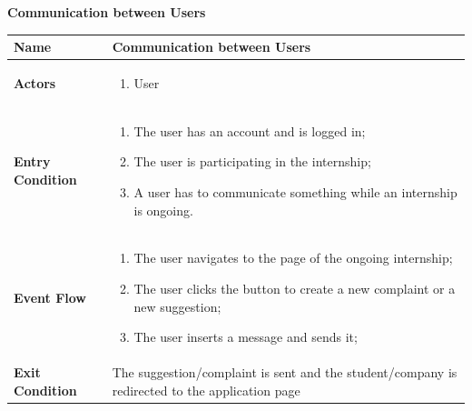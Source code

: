\begin{enumerate}[label=\textbf{[US\arabic*]}, left = 0pt, align = left, resume]
            \newpage
            \item \textbf{Communication between Users}
            
            \begin{longtable}{|l|p{11cm}|}  
                \hline
                \textbf{Name} & 
                    \textbf{Communication between Users} \\
                \hline
                
                \textbf{Actors} & 
                    \begin{enumerate}[label=\textbullet, itemsep=0em]
                        \item User
                    \end{enumerate} \\
                \hline
                
                \textbf{Entry Condition} & 
                    \begin{enumerate}[label=\textbullet, itemsep=0em]
                        \item The user has an account and is logged in;
                        \item The user is participating in the internship;
                        \item A user has to communicate something while an internship is ongoing.
                    \end{enumerate} \\
                \hline
                
                \textbf{Event Flow} &
                    \begin{enumerate}[label=\arabic*., itemsep=0.2em]
                        \item The user navigates to the page of the ongoing internship;
                        \item The user clicks the button to create a new complaint or a new suggestion;
                        \item The user inserts a message and sends it; 
                    \end{enumerate} \\
                \hline
                
                \textbf{Exit Condition} & 
                    The suggestion/complaint is sent and the student/company is redirected to the application page \\
                \hline
                \hline
            \end{longtable}


\end{enumerate}
